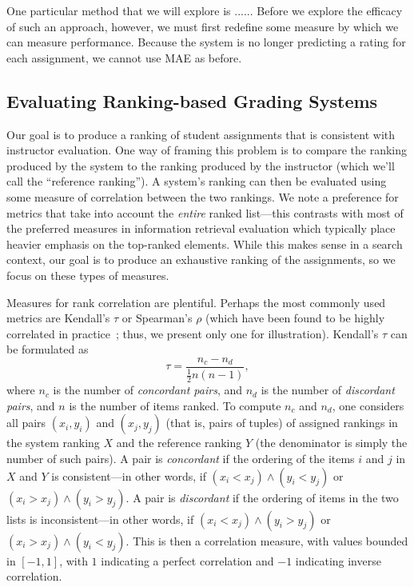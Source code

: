 One particular method that we will explore is ......  Before we explore the efficacy of such an approach, however, we must first
redefine some measure by which we can measure performance. Because the
system is no longer predicting a rating for each assignment, we cannot use
MAE as before.

\subsection{Evaluating Ranking-based Grading Systems}
Our goal is to produce a ranking of student assignments that is consistent
with instructor evaluation. One way of framing this problem is to compare
the ranking produced by the system to the ranking produced by the
instructor (which we'll call the ``reference ranking''). A system's ranking
can then be evaluated using some measure of correlation between the two
rankings. We note a preference for metrics that take into account the
\emph{entire} ranked list---this contrasts with most of the preferred
measures in information retrieval evaluation which typically place heavier
emphasis on the top-ranked elements. While this makes sense in a search
context, our goal is to produce an exhaustive ranking of the assignments,
so we focus on these types of measures.

Measures for rank correlation are plentiful. Perhaps the most commonly
used metrics are Kendall's $\tau$ or Spearman's $\rho$ (which have been
found to be highly correlated in practice~\cite{Shani:2011:Springer}; thus,
we present only one for illustration). Kendall's $\tau$ can be formulated
as
\[
    \tau = \frac{n_c - n_d}{\frac{1}{2} n (n-1)},
\]
where $n_c$ is the number of \emph{concordant pairs}, and $n_d$ is the number
of \emph{discordant pairs}, and $n$ is the number of items ranked. To
compute $n_c$ and $n_d$, one considers all pairs $(x_i, y_i)$ and $(x_j,
y_j)$ (that is, pairs of tuples) of assigned rankings in the system ranking
$X$ and the reference ranking $Y$ (the denominator is simply the number of
such pairs). A pair is \emph{concordant} if the ordering of the items $i$
and $j$ in $X$ and $Y$ is consistent---in other words, if $(x_i < x_j)
\land (y_i < y_j)$ or $(x_i > x_j) \land (y_i > y_j)$.  A pair is
\emph{discordant} if the ordering of items in the two lists is
inconsistent---in other words, if $(x_i < x_j) \land (y_i > y_j)$ or $(x_i
> x_j) \land (y_i < y_j)$. This is then a correlation measure, with values
bounded in $[-1, 1]$, with $1$ indicating a perfect correlation and $-1$
indicating inverse correlation.

